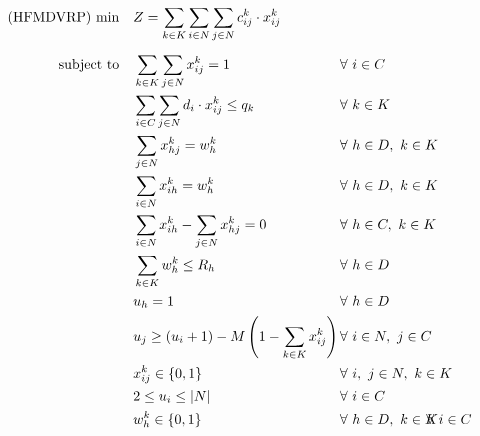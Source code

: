 \documentclass[preprint,review,12pt]{elsarticle}
\begin{document}
\begin{align}
    \text{(HFMDVRP) min} \quad        & Z = \sum\limits_{k\in K}\sum\limits_{i\in N}\sum\limits_{j\in N} c_{ij}^k \cdot x_{ij}^k    && \label{MDMVRP_FObj}    \\[5pt]
	\noindent \text{subject to} \quad & \sum\limits_{k \in K}\sum\limits_{j \in N} x_{ij}^k = 1                       && \text{\hspace{-1cm}} \forall \ i \in C \label{MDMVRP_Service} \\
	& \sum\limits_{i \in C}\sum\limits_{j \in N}d_i \cdot x_{ij}^k \leq q_k               && \text{\hspace{-1cm}} \forall \ k \in K  \label{MDMVRP_Capacity} \\
	& \sum\limits_{j \in N}x_{hj}^k = w_h^k                                         && \text{\hspace{-1cm}} \forall \ h \in D,\ k \in K \label{MDMVRP_StartRoute} \\
	& \sum\limits_{i \in N}x_{ih}^k = w_h^k                                         && \text{\hspace{-1cm}} \forall \ h \in D,\ k \in K \label{MDMVRP_EndRoute} \\
	& \sum\limits_{i \in N}x_{ih}^k - \sum\limits_{j \in N}x_{hj}^k = 0             && \text{\hspace{-1cm}} \forall \ h \in C,\ k \in K \label{MDMVRP_Balance} \\
	& \sum\limits_{k \in K}w_h^k \leq R_h                                     && \text{\hspace{-1cm}} \forall \ h \in D \label{MDMVRP_CapacityD} \\
	& u_h = 1                                                                       && \text{\hspace{-1cm}} \forall \ h \in D \label{MDMVRP_InitialU}\\
	& u_j \geq (u_i + 1) - M \left(1 - \sum\limits_{k \in K}x_{ij}^k \right) \qquad && \text{\hspace{-1cm}} \forall \ i \in N,\ j \in C \label{MDMVRP_OrderU}\\
	& x_{ij}^k \in\{0,1\}                                                           && \text{\hspace{-1cm}} \forall \ i, \ j \in N,\ k \in K \label{MDMVRP_DomainX}\\
	& 2 \leq u_i \leq |N|                                                           && \text{\hspace{-1cm}} \forall \ i \in C \label{MDVMRP_DomainU} \\
	& w_h^k  \in\{0,1\}                                                             && \text{\hspace{-1cm}} \forall \ h \in D, \ k \in K \label{MDVMRP_DomainW}                                                        && \text{\hspace{-1cm}} \forall \ i \in C \label{VRP_DomainU}
\end{align}
\end{document}
